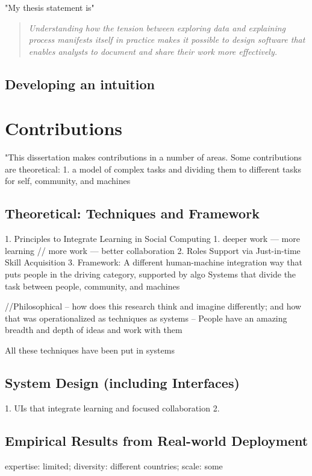 "My thesis statement is"
\begin{quote}
\emph{Understanding how the tension between exploring data and explaining process manifests itself in practice makes it possible to design software that enables analysts to document and share their work more effectively.}
\end{quote}

 \subsection{Developing an intuition}


\section{Contributions}
"This dissertation makes contributions in a number of areas. Some contributions are theoretical:
1. a model of complex tasks and dividing them to different tasks for self, community, and machines

\subsection{Theoretical: Techniques and Framework}
1. Principles to Integrate Learning in Social Computing
	1. deeper work — more learning   //     more work — better collaboration
2. Roles Support via Just-in-time Skill Acquisition
3. Framework: A different human-machine integration way 
  that puts people in the driving category, supported by algo
 Systems that divide the task between people, community, and machines

//Philosophical -- how does this research think and imagine differently; and how that was operationalized as techniques as systems
-- People have an amazing breadth and depth of ideas and work with them

All these techniques have been put in systems

\subsection{System Design (including Interfaces)}
1. UIs that integrate learning and focused collaboration
2. 

\subsection{Empirical Results from Real-world Deployment}
expertise: limited; diversity: different countries; scale: some


